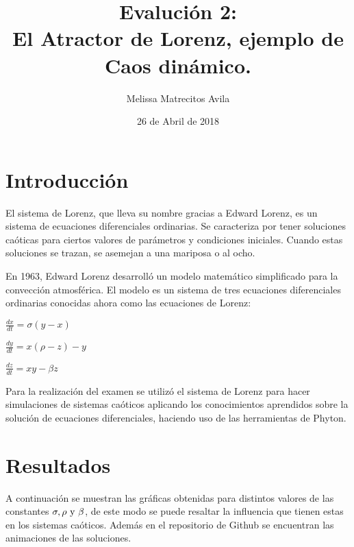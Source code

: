 \documentclass{article}
\title{Evalución 2: \\ El Atractor de Lorenz, ejemplo de Caos dinámico.}
\author{Melissa Matrecitos Avila}
\date{26 de Abril de 2018}
\begin{document}
\maketitle

\section{Introducción}

El sistema de Lorenz, que lleva su nombre gracias a Edward Lorenz, es un sistema de ecuaciones diferenciales ordinarias. Se caracteriza por tener soluciones caóticas para ciertos valores de parámetros y condiciones iniciales. Cuando estas soluciones se trazan, se asemejan a una mariposa o al ocho.

En 1963, Edward Lorenz desarrolló un modelo matemático simplificado para la convección atmosférica. El modelo es un sistema de tres ecuaciones diferenciales ordinarias conocidas ahora como las ecuaciones de Lorenz:

\centerline {$\displaystyle \frac{dx}{dt}=\sigma(y-x)$}
\centerline {$\displaystyle \frac{dy}{dt}=x(\rho-z)-y$}
\centerline {$\displaystyle \frac{dz}{dt}=xy-\beta z$}

Para la realización del examen se utilizó el sistema de Lorenz para hacer simulaciones de sistemas caóticos aplicando los conocimientos aprendidos sobre la solución de ecuaciones diferenciales, haciendo uso de las herramientas de Phyton.

\section{Resultados}
A continuación se muestran las gráficas obtenidas para distintos valores de las constantes $ \sigma, \rho  \textup{ y } \beta$, de este modo se puede resaltar la influencia que tienen estas en los sistemas caóticos. Además en el repositorio de Github se encuentran las animaciones de las soluciones.
\end{document}
